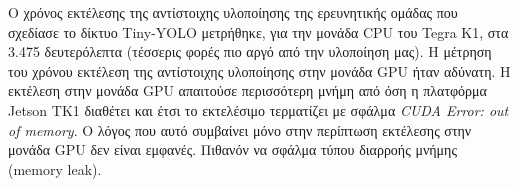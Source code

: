 Ο χρόνος εκτέλεσης της αντίστοιχης υλοποίησης της ερευνητικής ομάδας που
σχεδίασε το δίκτυο Tiny-YOLO μετρήθηκε, για την μονάδα CPU του Tegra K1,
στα 3.475 δευτερόλεπτα (τέσσερις φορές πιο αργό από την υλοποίηση
μας).
Η μέτρηση του χρόνου εκτέλεση της αντίστοιχης
υλοποίησης στην μονάδα GPU ήταν αδύνατη. Η εκτέλεση στην μονάδα GPU
απαιτούσε περισσότερη μνήμη από όση η πλατφόρμα Jetson TK1 διαθέτει και έτσι
το εκτελέσιμο τερματίζει με σφάλμα \emph{CUDA Error: out of memory}.
Ο λόγος που αυτό συμβαίνει μόνο στην περίπτωση εκτέλεσης στην μονάδα GPU
δεν είναι εμφανές. Πιθανόν να σφάλμα τύπου διαρροής μνήμης (memory leak).


